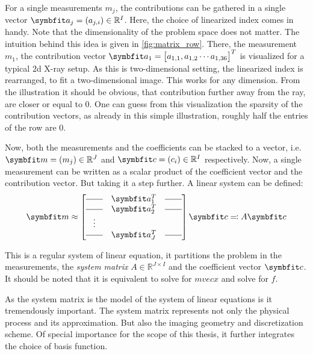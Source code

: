 For a single measurements \(m_j\), the contributions can be gathered in a single vector \(\mvec{a}_j
= (a_{j,i}) \in \mathbb{R}^I\). Here, the choice of linearized index comes in handy. Note that the
dimensionality of the problem space does not matter. The intuition behind this idea is given in
\autoref{fig:matrix_row}. There, the measurement \(m_1\), the contribution vector \(\mvec{a}_{1} =
\begin{bmatrix}a_{1, 1}, a_{1, 2} \cdots a_{1,36}\end{bmatrix}^T\) is visualized for a typical
\(2\)d X-ray setup. As this is two-dimensional setting, the linearized index is rearranged, to fit a
two-dimensional image. This works for any dimension. From the illustration it should be obvious,
that contribution further away from the ray, are closer or equal to \(0\). One can guess from this
visualization the sparsity of the contribution vectors, as already in this simple illustration,
roughly half the entries of the row are \(0\).

Now, both the measurements and the coefficients can be stacked to a vector, i.e.\ \(\mvec{m} = (m_j)
\in \mathbb{R}^J\) and \(\mvec{c} = (c_i) \in \mathbb{R}^I\) respectively. Now, a single measurement
can be written as a scalar product of the coefficient vector and the contribution vector. But taking
it a step further. A linear system can be defined:
\begin{equation}\label{eq:system_lin_equation}
	\mvec{m} \approx
	\begin{bmatrix}
		\rule[.5ex]{2em}{0.4pt} & \mvec{a}_1^T & \rule[.5ex]{2em}{0.4pt} \\
		\rule[.5ex]{2em}{0.4pt} & \mvec{a}_2^T & \rule[.5ex]{2em}{0.4pt} \\
		\vdots                                                           \\
		\rule[.5ex]{2em}{0.4pt} & \mvec{a}_J^T & \rule[.5ex]{2em}{0.4pt}
	\end{bmatrix} \mvec{c} \eqcolon A \mvec{c}
\end{equation}

This is a regular system of linear equation, it partitions the problem in the measurements, the
\textit{system matrix} \(A \in \mathbb{R}^{J \times I}\) and the coefficient vector \(\mvec{c}\).
It should be noted that it is equivalent to solve for \(mvec{x}\) and solve for \(f\).

As the system matrix is the model of the system of linear equations is it tremendously important.
The system matrix represents not only the physical process and its approximation. But also the
imaging geometry and discretization scheme. Of special importance for the scope of this thesis, it
further integrates the choice of basis function.

